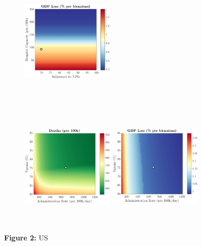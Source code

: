 \documentclass[paper=a4, fontsize=11pt]{scrartcl}
\numberwithin{figure}{section}
\numberwithin{table}{section}
\begin{document}
\begin{figure}[H]
\begin{subfigure}[b]{\textwidth}
	\hspace{0.05cm}
    	\includegraphics[width=0.49\textwidth,height=6cm]{US/COVID/npl_g}
    \end{subfigure}
    \begin{subfigure}[b]{\textwidth}
      	\includegraphics[width=0.49\textwidth,height=6cm]{US/COVID/imm_d}
	\hspace{0.05cm}
    	\includegraphics[width=0.49\textwidth,height=6cm]{US/COVID/imm_g}
    \end{subfigure}
\caption*{\textbf{Figure 2:} US} 
\end{figure}
\end{document}
